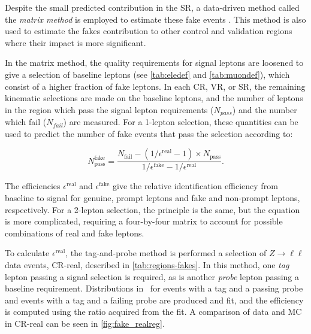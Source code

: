 Despite the small predicted contribution in the \ac{SR}, a data-driven method called the \textit{matrix method} is employed to estimate these fake events \cite{SUSY-2013-20}. This method is also used to estimate the fakes contribution to other control and validation regions where their impact is more significant. 

In the matrix method, the quality requirements for signal leptons are loosened to give a selection of baseline leptons (see \autoref{tab:eledef} and \autoref{tab:muondef}), which consist of a higher fraction of fake leptons. In each \ac{CR}, \ac{VR}, or \ac{SR}, the remaining kinematic selections are made on the baseline leptons, and the number of leptons in the region which pass the signal lepton requirements ($N_{pass}$) and the number which fail ($N_{fail}$) are measured. For a 1-lepton selection, these quantities can be used to predict the number of fake events that pass the selection according to:

\begin{equation}
N_{\text{pass}}^{\text{fake}} = \frac{N_{\text{fail}} - (1/\epsilon^{\text{real}} - 1) \times N_{\text{pass}} }{1/\epsilon^{\text{fake}} - 1/\epsilon^{\text{real}}}.
\end{equation}

The efficiencies $\epsilon^\text{real}$ and $\epsilon^\text{fake}$ give the relative identification efficiency from baseline to signal for genuine, prompt leptons and fake and non-prompt leptons, respectively. For a 2-lepton selection, the principle is the same, but the equation is more complicated, requiring a four-by-four matrix to account for possible combinations of real and fake leptons. 


To calculate $\epsilon^\text{real}$, the tag-and-probe method is performed a selection of $Z\rightarrow\ell\ell$ data events, CR-real, described in \autoref{tab:regions-fakes}. In this method, one \textit{tag} lepton passing a signal selection is required, as is another \textit{probe} lepton passing a baseline requirement. Distributions in \mll~for events with a tag and a passing probe and events with a tag and a failing probe are produced and fit, and the efficiency is computed using the ratio acquired from the fit. A comparison of data and \ac{MC} in CR-real can be seen in \autoref{fig:fake_realreg}.
 
